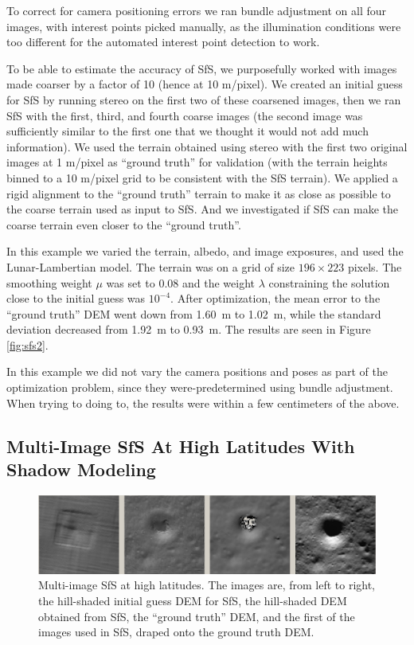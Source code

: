 \documentclass[12pt,oneside]{article}
\begin{document}
To correct for camera positioning errors we ran bundle adjustment on all
four images, with interest points picked manually, as the illumination
conditions were too different for the automated interest point
detection to work. 

To be able to estimate the accuracy of SfS, we purposefully
worked with images made coarser by a factor of 10 (hence at 10
m/pixel). We created an initial guess for SfS by running stereo on
the first two of these coarsened images, then we ran SfS with the first,
third, and fourth coarse images (the second image was sufficiently
similar to the first one that we thought it would not add much
information). We used the terrain obtained using stereo with the first
two original images at 1 m/pixel as ``ground truth'' for
validation (with the terrain heights binned to a 10 m/pixel grid to be
consistent with the SfS terrain). We applied a rigid alignment to the
``ground truth'' terrain to make it as close as possible to the coarse
terrain used as input to SfS.  And we investigated if SfS can make the
coarse terrain even closer to the ``ground truth''.

In this example we varied the terrain, albedo, and image exposures, and
used the Lunar-Lambertian model.  The terrain was on a grid of size
$196\times 223$ pixels. The smoothing weight $\mu$ was set to 0.08 and
the weight $\lambda$ constraining the solution close to the initial
guess was $10^{-4}$. After optimization, the mean error to the ``ground truth'' DEM went
down from 1.60~m to 1.02~m, while the standard deviation
decreased from 1.92~m to 0.93~m. The results are seen in Figure \ref{fig:sfs2}.

In this example we did not vary the camera positions and poses as part
of the optimization problem, since they were-predetermined using bundle adjustment. When trying
to doing to, the results were within a few centimeters of the above. 

\subsection{Multi-Image SfS At High Latitudes With Shadow Modeling}

\begin{figure}[h!]
\begin{center}
\includegraphics[width=6in]{figures/sfs3.jpg}
\caption[sfs]{Multi-image SfS at high latitudes. The images are, from
  left to right, the hill-shaded initial guess DEM for SfS, the hill-shaded DEM obtained
from SfS, the ``ground truth'' DEM, and the first of the
images used in SfS, draped onto the ground truth DEM.}
\label{fig:sfs3}
\end{center}
\end{figure}
\end{document}
